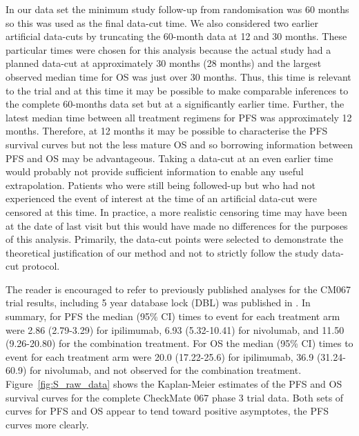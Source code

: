 \documentclass[AMA,STIX1COL]{WileyNJD-v2}
\begin{document}
In our data set the minimum study follow-up from randomisation was 60 months so this was used as the final data-cut time.
We also considered two earlier artificial data-cuts by truncating the 60-month data at 12 and 30 months.
These particular times were chosen for this analysis because the actual study had a planned data-cut at approximately 30 months (28 months) and the largest observed median time for OS was just over 30 months. Thus, this time is relevant to the trial and at this time it may be possible to make comparable inferences to the complete 60-months data set but at a significantly earlier time.
Further, the latest median time between all treatment regimens for PFS was approximately 12 months. Therefore, at 12 months it may be possible to characterise the PFS survival curves but not the less mature OS and so borrowing information between PFS and OS may be advantageous. Taking a data-cut at an even earlier time would probably not provide sufficient information to enable any useful extrapolation.
Patients who were still being followed-up but who had not experienced the event of interest at the time of an artificial data-cut were censored at this time. In practice, a more realistic censoring time may have been at the date of last visit but this would have made no differences for the purposes of this analysis. Primarily, the data-cut points were selected to demonstrate the theoretical justification of our method and not to strictly follow the study data-cut protocol.

The reader is encouraged to refer to previously published analyses for the CM067 trial results, including 5 year database lock (DBL) was published in \cite{Larkin2019}. In summary, for PFS the median (95\% CI) times to event for each treatment arm were 2.86 (2.79-3.29) for ipilimumab, 6.93 (5.32-10.41) for nivolumab, and 11.50 (9.26-20.80) for the combination treatment. For OS the median (95\% CI) times to event for each treatment arm were 20.0 (17.22-25.6) for ipilimumab, 36.9 (31.24-60.9) for nivolumab, and not observed for the combination treatment.
Figure~\ref{fig:S_raw_data} shows the Kaplan-Meier estimates of the PFS and OS survival curves for the complete CheckMate 067 phase 3 trial data.
Both sets of curves for PFS and OS appear to tend toward positive asymptotes, the PFS curves more clearly.
\end{document}
